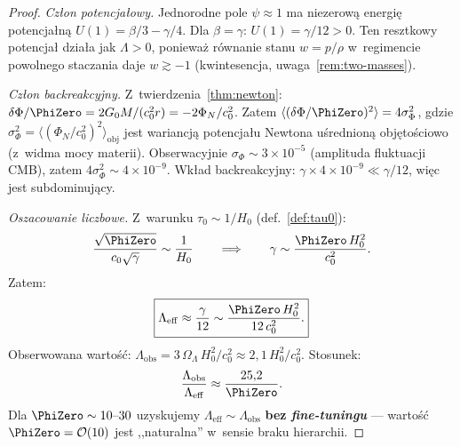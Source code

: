 \begin{proof}
\emph{Cz\l{}on potencja\l{}owy.}\quad
Jednorodne pole $\psi \approx 1$ ma niezerow\k{a} energi\k{e}
potencja\l{}n\k{a} $U(1) = \beta/3 - \gamma/4$.
Dla $\beta = \gamma$: $U(1) = \gamma/12 > 0$.
Ten resztkowy potencja\l{} dzia\l{}a jak $\Lambda > 0$,
poniewa\.z r\'ownanie stanu $w = p/\rho$ w~regimencie
powolnego staczania daje $w \gtrsim -1$ (kwintesencja,
uwaga~\ref{rem:two-masses}).

\emph{Cz\l{}on backreakcyjny.}\quad
Z~twierdzenia~\ref{thm:newton}: $\delta\Phi/\PhiZero = 2G_0 M/(c_0^2 r)
= -2\Phi_N/c_0^2$.
Zatem $\langle(\delta\Phi/\PhiZero)^2\rangle = 4\sigma_\Phi^2$,
gdzie $\sigma_\Phi^2 = \langle(\Phi_N/c_0^2)^2\rangle_{\mathrm{obj}}$
jest wariancj\k{a} potencja\l{}u Newtona u\'srednion\k{a}
obj\k{e}to\'sciowo (z~widma mocy materii).
Obserwacyjnie $\sigma_\Phi \sim 3 \times 10^{-5}$
(amplituda fluktuacji CMB), zatem
$4\sigma_\Phi^2 \sim 4 \times 10^{-9}$.
Wk\l{}ad backreakcyjny: $\gamma \times 4 \times 10^{-9}
\ll \gamma/12$, wi\k{e}c jest subdominuj\k{a}cy.

\emph{Oszacowanie liczbowe.}\quad
Z~warunku $\tau_0 \sim 1/H_0$ (def.~\ref{def:tau0}):
\[
  \frac{\sqrt{\PhiZero}}{c_0\sqrt{\gamma}} \sim \frac{1}{H_0}
  \qquad\Longrightarrow\qquad
  \gamma \sim \frac{\PhiZero\,H_0^2}{c_0^2}.
\]
Zatem:
\begin{equation}\label{eq:Lambda-estimate}
  \boxed{
    \Lambda_{\mathrm{eff}}
    \approx \frac{\gamma}{12}
    \sim \frac{\PhiZero\,H_0^2}{12\,c_0^2}.
  }
\end{equation}
Obserwowana warto\'s\'c: $\Lambda_{\mathrm{obs}}
= 3\,\Omega_\Lambda\,H_0^2/c_0^2 \approx 2{,}1\,H_0^2/c_0^2$.
Stosunek:
\begin{equation}\label{eq:Lambda-ratio}
  \frac{\Lambda_{\mathrm{obs}}}{\Lambda_{\mathrm{eff}}}
  \approx \frac{25{,}2}{\PhiZero}.
\end{equation}
Dla $\PhiZero \sim 10\text{--}30$ uzyskujemy
$\Lambda_{\mathrm{eff}} \sim \Lambda_{\mathrm{obs}}$
\textbf{bez \emph{fine-tuningu}} --- warto\'s\'c $\PhiZero = \mathcal{O}(10)$
jest ,,naturalna'' w~sensie braku hierarchii.
\end{proof}

